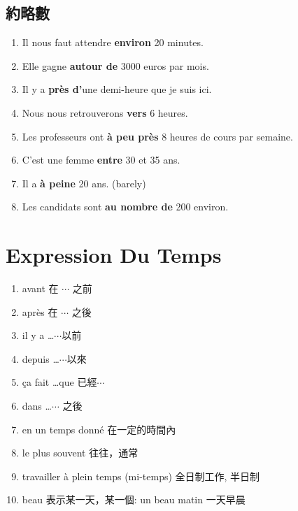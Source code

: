 \documentclass{book}
\begin{document}
        \subsection{約略數}
            \begin{enumerate}
                \item Il nous faut attendre \textbf{environ} 20 minutes.
                \item Elle gagne \textbf{autour de} 3000 euros par mois.
                \item Il y a \textbf{près d'}une demi-heure que je suis ici.
                \item Nous nous retrouverons \textbf{vers} 6 heures.
                \item Les professeurs ont \textbf{à peu près} 8 heures de cours par semaine.
                \item C'est une femme \textbf{entre} 30 et 35 ans.
                \item Il a \textbf{à peine} 20 ans. (barely)
                \item Les candidats sont \textbf{au nombre de} 200 environ.
            \end{enumerate}
            

    \section{Expression Du Temps}
        \begin{enumerate}
            \item avant 在 $\cdots$ 之前
            \item après 在 $\cdots$ 之後
            \item il y a \dots $\cdots$以前
            \item depuis \dots $\cdots$以來
            \item ça fait \dots que 已經$\cdots$
            \item dans \dots $\cdots$ 之後
            \item en un temps donné 在一定的時間內
            \item le plus souvent 往往，通常
            \item travailler à plein temps (mi-temps) 全日制工作, 半日制
            \item beau 表示某一天，某一個: un beau matin 一天早晨
        \end{enumerate}
\end{document}
